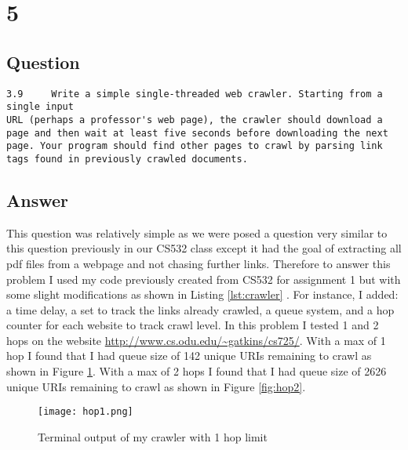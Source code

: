 \documentclass[letterpaper,11pt]{article}
\newcommand*{\srcPath}{../src}%
\begin{document}
\clearpage


\section*{5}

\subsection*{Question}

\begin{verbatim}
3.9 	Write a simple single-threaded web crawler. Starting from a single input
URL (perhaps a professor's web page), the crawler should download a
page and then wait at least five seconds before downloading the next
page. Your program should find other pages to crawl by parsing link
tags found in previously crawled documents.
\end{verbatim}

\subsection*{Answer}

This question was relatively simple as we were posed a question very similar to this question previously in our CS532 class except it had the goal of extracting all pdf files from a webpage and not chasing further links.
Therefore to answer this problem I used my code previously created from CS532 for assignment 1 but with some slight modifications as shown in Listing \ref{lst:crawler} \cite{cs532}.
For instance, I added: a time delay, a set to track the links already crawled, a queue system, and a hop counter for each website to track crawl level.
In this problem I tested 1 and 2 hops on the website \url{http://www.cs.odu.edu/~gatkins/cs725/}.
With a max of 1 hop I found that I had queue size of 142 unique URIs remaining to crawl as shown in Figure \ref{fig:hop1}.
With a max of 2 hops I found that I had queue size of 2626 unique URIs remaining to crawl as shown in Figure \ref{fig:hop2}.

 

\clearpage

\begin{figure}[h]
\centering
\texttt{[image: hop1.png]}
\caption{Terminal output of my crawler with 1 hop limit}
\label{fig:hop1}
\end{figure}
\end{document}
